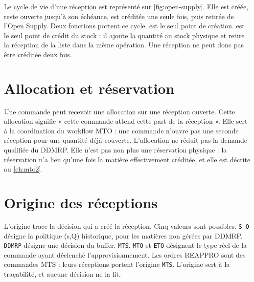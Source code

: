 Le cycle de vie d'une réception est représenté sur \cref{fig:open-supply}. Elle est créée, reste
ouverte jusqu'à son échéance, est créditée une seule fois, puis retirée de l'Open Supply.
Deux fonctions portent ce cycle.  est le seul point de création.
 est le seul point de crédit du stock : il ajoute la quantité au stock
physique et retire la réception de la liste dans la même opération. Une réception ne peut donc pas
être créditée deux fois.



\section{Allocation et réservation}

Une commande peut recevoir une allocation sur une réception ouverte. Cette allocation signifie
« cette commande attend cette part de la réception ». Elle sert à la coordination du workflow MTO :
une commande n'ouvre pas une seconde réception pour une quantité déjà couverte. L'allocation ne
réduit pas la demande qualifiée du DDMRP. Elle n'est pas non plus une réservation physique : la
réservation n'a lieu qu'une fois la matière effectivement créditée, et elle est décrite au
\cref{ch:mto2}.

\section{Origine des réceptions}

L'origine trace la décision qui a créé la réception. Cinq valeurs sont possibles. \texttt{S\_Q}
désigne la politique (s,Q) historique, pour les matières non gérées par DDMRP. \texttt{DDMRP}
désigne une décision du buffer. \texttt{MTS}, \texttt{MTO} et \texttt{ETO} désignent le type réel de
la commande ayant déclenché l'approvisionnement. Les ordres REAPPRO sont des commandes MTS : leurs
réceptions portent l'origine \texttt{MTS}. L'origine sert à la traçabilité, et aucune décision ne la lit.
